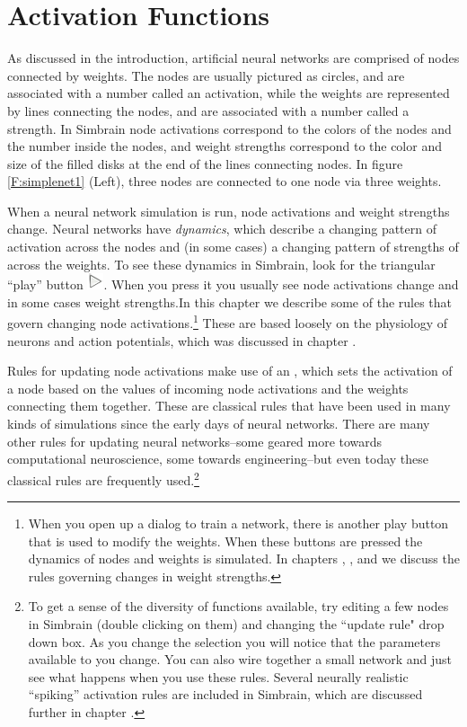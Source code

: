 \chapter{Activation Functions}\label{ch_act_functions}

 As discussed in the introduction, artificial neural networks are comprised of nodes connected by weights. The nodes are usually pictured as  circles, and are associated with a number called an activation, while the weights are represented by lines connecting the nodes, and are associated with a number called a strength. In Simbrain node activations correspond to the colors of the nodes and the number inside the nodes, and weight strengths correspond to the color and size of the filled disks at the end of the lines connecting nodes. In figure \ref{F:simplenet1} (Left), three nodes are connected to one node via three weights. 

When a neural network simulation is run, node activations and weight strengths change. Neural networks have \emph{dynamics}, which describe a changing pattern of activation across the nodes and (in some cases) a changing pattern of strengths of across the weights. To see these dynamics in Simbrain, look for the triangular ``play''  button \includegraphics[scale=.5]{./images/Play.png}. When you press it you usually see node activations change and in some cases weight strengths.In this chapter we describe some of the rules that govern changing node activations.\footnote{When you open up a dialog to train a network, there is another play button that is used to modify the weights. When these buttons are pressed the dynamics of nodes and weights is simulated. In chapters , , and  we discuss the rules governing changes in weight strengths.} These are based loosely on the physiology of neurons and action potentials, which was discussed in chapter . 

Rules for updating node activations make use of an , which sets the activation of a node based on the values of incoming node activations and the weights connecting them together. These are classical rules that have been used in many kinds of simulations since the early days of neural networks. There are many other rules for updating neural networks--some geared more towards computational neuroscience, some towards engineering--but even today these classical rules are frequently used.\footnote{To get a sense of the diversity of functions available, try editing a few nodes in Simbrain (double clicking on them) and changing the 
``update rule" drop down box. As you change the selection you will notice that 
the parameters available to you change. You can also wire together a small 
network and just see what happens when you use these rules. Several neurally realistic ``spiking'' activation rules are included in Simbrain, which are discussed further in chapter .}

